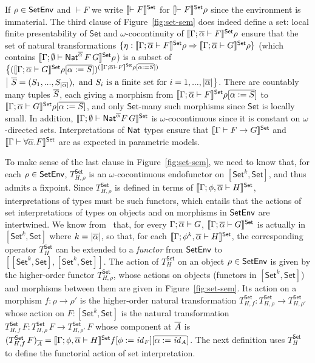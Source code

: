 \documentclass[runningheads]{llncs}
\newcommand{\set}{\mathsf{Set}}
\renewcommand{\id}{\mathit{id}}
\renewcommand{\id}{\mathit{id}}
\begin{document}
If $\rho \in \mathsf{SetEnv}$ and $\vdash F$ we write $\setsem{\vdash F}$ for
$\setsem{\vdash F}\rho$ since the environment is immaterial. The third
clause of Figure~\ref{fig:set-sem} does indeed define a set: local
finite presentability of $\set$ and $\omega$-cocontinuity of
$\setsem{\Gamma;\ol{\alpha} \vdash F}\rho$ ensure that the set of
natural transformations $\{\eta : \setsem{\Gamma;\ol{\alpha} \vdash
  F}\rho \Rightarrow \setsem{\Gamma;\ol{\alpha} \vdash G}\rho\}$
(which contains $\setsem{\Gamma;\emptyset \vdash
  \Nat^{\ol{\alpha}}\,F\,G}\rho$) is a subset of
$\big\{({\setsem{\Gamma;\ol{\alpha} \vdash G}\rho[\ol{\alpha :=
      S}]})^{(\setsem{\Gamma;\ol{\alpha} \vdash F}\rho[\ol{\alpha :=
      S}])}$ $\big|~ \overline{S} = (S_1,...,S_{|\overline{\alpha}|}), \mbox{ and
} S_i \mbox{ is a finite set for } i =
1,...,|\overline{\alpha}|\big\}$. There are countably many tuples $\overline{S}$,
each giving a morphism from ${\setsem{\Gamma;\ol{\alpha} \vdash
    F}\rho[ \ol{\alpha := S}]}$ to ${\setsem{\Gamma;\ol{\alpha} \vdash
    G}\rho[\ol{\alpha := S}]}$, and only $\set$-many such morphisms
since $\set$ is locally small.  In addition, $\setsem{\Gamma;
  \emptyset \vdash \Nat^{\ol\alpha} F\,G}$ is $\omega$-cocontinuous
since it is constant on $\omega$-directed sets. Interpretations of
$\mathsf{Nat}$ types ensure that $\setsem{\Gamma \vdash F \to G}$ and
$\setsem{\Gamma \vdash \forall \ol\alpha. F}$ are as expected in
parametric models.

To make sense of the last clause in Figure~\ref{fig:set-sem}, we need
to know that, for each $\rho \in \mathsf{SetEnv}$, $T^\set_{H,\rho}$ is an
$\omega$-cocontinuous endofunctor on $[\set^k, \set]$, and thus admits
a fixpoint.  Since $T_{H,\rho}^\set$ is defined in terms of
$\setsem{\Gamma;\phi, \ol{\alpha} \vdash H}$, interpretations of types
must be such functors, which entails that the actions of set
interpretations of types on objects and on morphisms in $\mathsf{SetEnv}$ are
intertwined.  We know from~\cite{jp19} that, for every $\Gamma;
\overline{\alpha} \vdash G$, $\setsem{\Gamma; \ol{\alpha} \vdash G}$ is
actually in $[\set^k,\set]$ where $k = |\overline{\alpha}|$, so that, for
each $\setsem{\Gamma; \phi^k, \ol{\alpha} \vdash H}$, the
corresponding operator $T^\set_{H}$ can be extended to a {\em functor}
from $\mathsf{SetEnv}$ to $[[\set^k,\set],[\set^k,\set]]$. The action of
$T^\set_H$ on an object $\rho \in \mathsf{SetEnv}$ is given by the
higher-order functor $T_{H,\rho}^\set$, whose actions on objects
(functors in $[\set^k, \set]$) and morphisms between them are given in
Figure~\ref{fig:set-sem}. Its action on a morphism $f : \rho \to
\rho'$ is the higher-order natural transformation $T^\set_{H,f} :
T^\set_{H,\rho} \to T^\set_{H,\rho'}$ whose action on $F :
[\set^k,\set]$ is the natural transformation $T^\set_{H,f}\, F :
T^\set_{H,\rho}\,F \to T^\set_{H,\rho'}\,F$ whose component at
$\overline{A}$ is $(T^\set_{H,f}\, F)_{\ol{A}} = \setsem{\Gamma;
  \phi,\ol{\alpha} \vdash H}f[\phi := \id_F][\ol{\alpha :=
    \id_A}]$. The next definition uses $T^\set_H$ to define the
functorial action of set interpretation.
\end{document}

